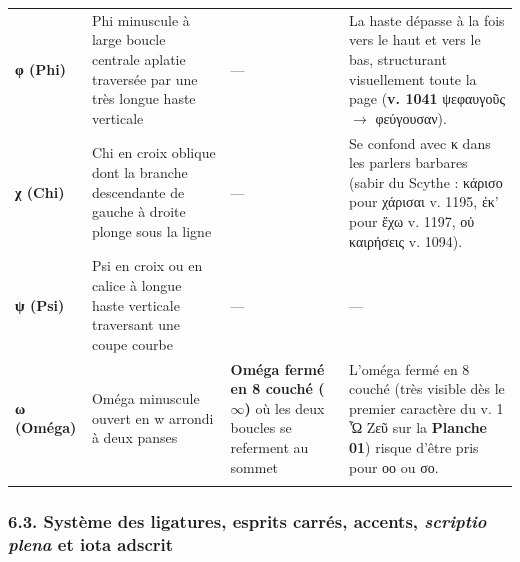 \documentclass[11pt, a4paper, twoside]{article}
\renewcommand{\_}{\origunderscore\penalty0\relax}
\renewcommand{\texttt}[1]{#1}
\begin{document}
{\begin{longtable}{@{}>{\raggedright\arraybackslash}p{} >{\raggedright\arraybackslash}p{} >{\raggedright\arraybackslash}p{} >{\raggedright\arraybackslash}p{}@{}}
\addlinespace[3pt]
\textbf{φ (Phi)} & Phi minuscule à large boucle centrale aplatie traversée par une très longue haste verticale & — & La haste dépasse à la fois vers le haut et vers le bas, structurant visuellement toute la page (\textbf{v. 1041} \texttt{ψεφαυγοῦς} $\to$ \texttt{φεύγουσαν}). \\
\addlinespace[3pt]
\textbf{χ (Chi)} & Chi en croix oblique dont la branche descendante de gauche à droite plonge sous la ligne & — & Se confond avec κ dans les parlers barbares (sabir du Scythe : \texttt{κάρισο} pour \texttt{χάρισαι} v. 1195, \texttt{έκ'} pour \texttt{ἔχω} v. 1197, \texttt{οὐ καιρήσεις} v. 1094). \\
\addlinespace[3pt]
\textbf{ψ (Psi)} & Psi en croix ou en calice à longue haste verticale traversant une coupe courbe & — & — \\
\addlinespace[3pt]
\textbf{ω (Oméga)} & Oméga minuscule ouvert en \texttt{w} arrondi à deux panses & \textbf{Oméga fermé en \texttt{8} couché ($\infty$)} où les deux boucles se referment au sommet & L'oméga fermé en \texttt{8} couché (très visible dès le premier caractère du v. 1 \texttt{Ὦ Ζεῦ} sur la \textbf{Planche 01}) risque d'être pris pour οο ou σο. \\
\addlinespace[3pt]
\end{longtable}
}


\subsubsection{6.3. Système des ligatures, esprits carrés, accents, \textit{scriptio plena} et iota adscrit}
\end{document}
